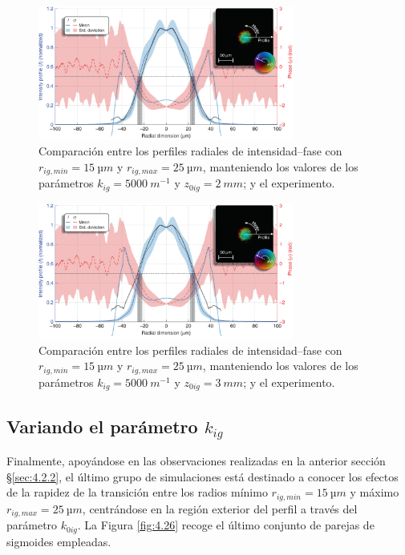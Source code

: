 \begin{figure}[htbp!]
  \centering
  \includegraphics[width=0.75\textwidth]{Figuras/ch4_cmp51.png}
  \caption{Comparación entre los perfiles radiales de intensidad--fase con $r_{ig,min}=\qty{15}{µm}$ y $r_{ig,max}=\qty{25}{µm}$, manteniendo los valores de los parámetros $k_{ig}=\qty{5000}{m^{-1}}$ y $z_{0ig}=\qty{2}{mm}$; y el experimento.}
  \label{fig:4.24}
\end{figure}

\begin{figure}[htbp!]
  \centering
  \includegraphics[width=0.75\textwidth]{Figuras/ch4_cmp52.png}
  \caption{Comparación entre los perfiles radiales de intensidad--fase con $r_{ig,min}=\qty{15}{µm}$ y $r_{ig,max}=\qty{25}{µm}$, manteniendo los valores de los parámetros $k_{ig}=\qty{5000}{m^{-1}}$ y $z_{0ig}=\qty{3}{mm}$; y el experimento.}
  \label{fig:4.25}
\end{figure}

\subsection{Variando el parámetro $k_{ig}$}\label{4.2.3}
Finalmente, apoyándose en las observaciones realizadas en la anterior sección \S\ref{sec:4.2.2}, el último grupo de simulaciones está destinado a conocer los efectos de la rapidez de la transición entre los radios mínimo $r_{ig,min}=\qty{15}{µm}$ y máximo $r_{ig,max}=\qty{25}{µm}$, centrándose en la región exterior del perfil a través del parámetro $k_{0ig}$. La Figura \ref{fig:4.26} recoge el último conjunto de parejas de sigmoides empleadas.

